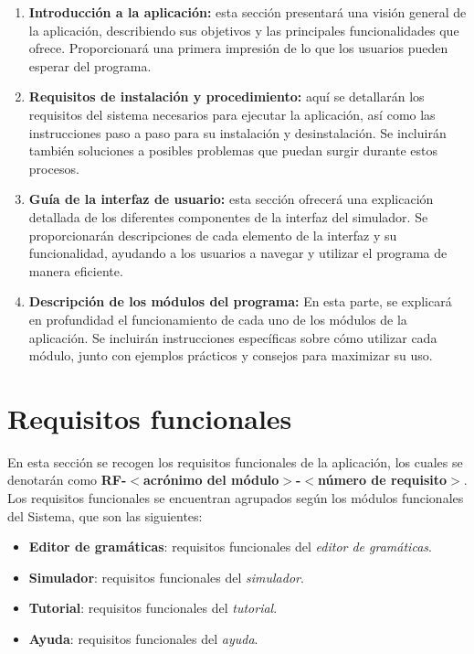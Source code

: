 \begin{enumerate}
    \item \textbf{Introducción a la aplicación:}
    esta sección presentará una visión general de la aplicación, describiendo sus objetivos y las principales funcionalidades que ofrece. Proporcionará una primera impresión de lo que los usuarios pueden esperar del programa.

    \item \textbf{Requisitos de instalación y procedimiento:}
    aquí se detallarán los requisitos del sistema necesarios para ejecutar la aplicación, así como las instrucciones paso a paso para su instalación y desinstalación. Se incluirán también soluciones a posibles problemas que puedan surgir durante estos procesos.

    \item \textbf{Guía de la interfaz de usuario:}
    esta sección ofrecerá una explicación detallada de los diferentes componentes de la interfaz del simulador. Se proporcionarán descripciones de cada elemento de la interfaz y su funcionalidad, ayudando a los usuarios a navegar y utilizar el programa de manera eficiente.

    \item \textbf{Descripción de los módulos del programa:}
    En esta parte, se explicará en profundidad el funcionamiento de cada uno de los módulos de la aplicación. Se incluirán instrucciones específicas sobre cómo utilizar cada módulo, junto con ejemplos prácticos y consejos para maximizar su uso.
\end{enumerate}


 \section{Requisitos funcionales}

En esta sección se recogen los requisitos funcionales de la aplicación, los cuales se denotarán como \textbf{RF-$<$acrónimo del módulo$>$-$<$número de requisito$>$}. Los requisitos funcionales se encuentran agrupados según los módulos funcionales del Sistema, que son las siguientes:

\begin{itemize}
 \item \textbf{Editor de gramáticas}: requisitos funcionales del \textit{editor de gramáticas}.
 \item \textbf{Simulador}: requisitos funcionales del \textit{simulador}.
 \item \textbf{Tutorial}: requisitos funcionales del \textit{tutorial}.
 \item \textbf{Ayuda}: requisitos funcionales  del \textit{ayuda}.
\end{itemize}


